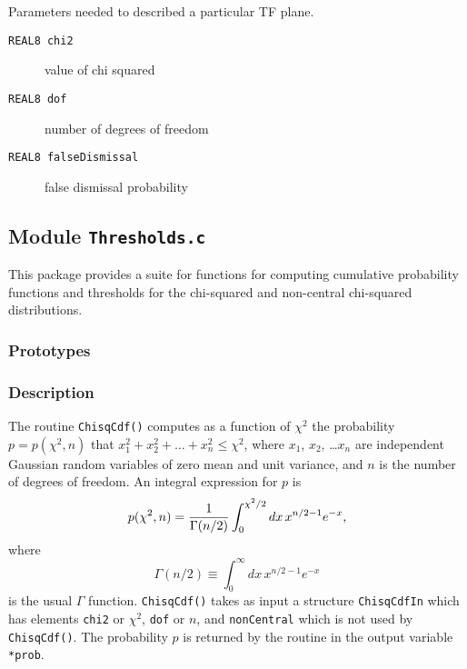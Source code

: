 \noindent Parameters needed to described a particular TF plane.

\begin{description}
\item[\texttt{REAL8     chi2}]   value of chi squared  
\item[\texttt{REAL8     dof}]  number of degrees of freedom
\item[\texttt{REAL8     falseDismissal}] false dismissal probability 
\end{description}

\newpage
\subsection{Module \texttt{Thresholds.c}}
\label{ss:Thresholds.c}

This package provides a suite for functions for computing cumulative
probability functions and thresholds for the chi-squared and
non-central chi-squared distributions.

\subsubsection*{Prototypes}
\vspace{0.1in}






\subsubsection*{Description}

The routine \verb+ChisqCdf()+ computes as a function of $\chi^2$ the
probability $p = p(\chi^2,n)$ that $x_1^2 + x_2^2 + \ldots + x_n^2 \le \chi^2$,
where $x_1$, $x_2$, \ldots $x_n$ are independent Gaussian random
variables of zero mean and unit variance, and $n$ is the number of
degrees of freedom.  An integral expression for $p$ is
$$
p(\chi^2,n) = {1 \over \Gamma(n/2)} \int_0^{\chi^2/2} dx \, x^{n/2-1} e^{-x},
$$
where 
$$
\Gamma(n/2) \equiv \int_0^\infty dx \, x^{n/2-1} e^{-x}
$$
is the usual $\Gamma$ function.  \verb+ChisqCdf()+ takes as input a
structure \verb+ChisqCdfIn+ which has elements \verb+chi2+ or
$\chi^2$, \verb+dof+ or $n$, and \verb+nonCentral+ which is not used
by \verb+ChisqCdf()+.  The probability $p$ is returned by the routine 
in the output variable \verb+*prob+.



